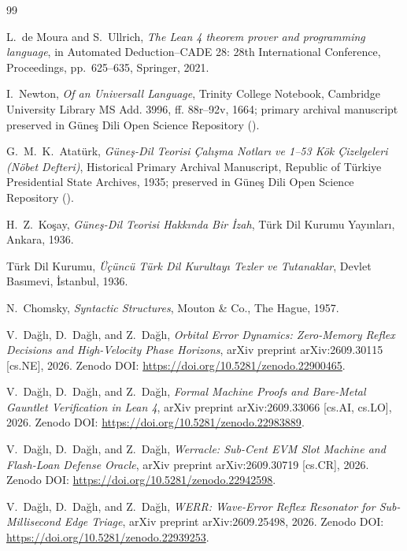 \documentclass[11pt,letterpaper]{article}
\begin{document}
\begin{thebibliography}{99}

L.~de Moura and S.~Ullrich,
\textit{The Lean 4 theorem prover and programming language},
in Automated Deduction--CADE 28: 28th International Conference, Proceedings, pp.~625--635, Springer, 2021.

I.~Newton,
\textit{Of an Universall Language},
Trinity College Notebook, Cambridge University Library MS Add. 3996, ff. 88r--92v, 1664; primary archival manuscript preserved in G\"{u}ne\c{s} Dili Open Science Repository ().

G.~M.~K.~Atat\"{u}rk,
\textit{G\"{u}ne\c{s}-Dil Teorisi \c{C}al\i\c{s}ma Notlar\i{} ve 1--53 K\"{o}k \c{C}izelgeleri (N\"{o}bet Defteri)},
Historical Primary Archival Manuscript, Republic of T\"{u}rkiye Presidential State Archives, 1935; preserved in G\"{u}ne\c{s} Dili Open Science Repository ().

H.~Z.~Ko\c{s}ay,
\textit{G\"{u}ne\c{s}-Dil Teorisi Hakk\i{}nda Bir \.{I}zah},
T\"{u}rk Dil Kurumu Yay\i{}nlar\i, Ankara, 1936.

T\"{u}rk Dil Kurumu,
\textit{\"{U}\c{c}\"{u}nc\"{u} T\"{u}rk Dil Kurultay\i{} Tezler ve Tutanaklar},
Devlet Bas\i{}mevi, \.{I}stanbul, 1936.

N.~Chomsky,
\textit{Syntactic Structures},
Mouton \& Co., The Hague, 1957.

V.~Da\u{g}l\i, D.~Da\u{g}l\i, and Z.~Da\u{g}l\i,
\textit{Orbital Error Dynamics: Zero-Memory Reflex Decisions and High-Velocity Phase Horizons},
arXiv preprint arXiv:2609.30115 [cs.NE], 2026. Zenodo DOI: \url{https://doi.org/10.5281/zenodo.22900465}.

V.~Da\u{g}l\i, D.~Da\u{g}l\i, and Z.~Da\u{g}l\i,
\textit{Formal Machine Proofs and Bare-Metal Gauntlet Verification in Lean 4},
arXiv preprint arXiv:2609.33066 [cs.AI, cs.LO], 2026. Zenodo DOI: \url{https://doi.org/10.5281/zenodo.22983889}.

V.~Da\u{g}l\i, D.~Da\u{g}l\i, and Z.~Da\u{g}l\i,
\textit{Werracle: Sub-Cent EVM Slot Machine and Flash-Loan Defense Oracle},
arXiv preprint arXiv:2609.30719 [cs.CR], 2026. Zenodo DOI: \url{https://doi.org/10.5281/zenodo.22942598}.

V.~Da\u{g}l\i, D.~Da\u{g}l\i, and Z.~Da\u{g}l\i,
\textit{WERR: Wave-Error Reflex Resonator for Sub-Millisecond Edge Triage},
arXiv preprint arXiv:2609.25498, 2026. Zenodo DOI: \url{https://doi.org/10.5281/zenodo.22939253}.


\end{thebibliography}
\end{document}
